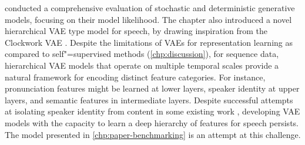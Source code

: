 

\vspace{1em}
\textbf{} conducted a comprehensive evaluation of stochastic and deterministic generative models, focusing on their model likelihood. 
The chapter also introduced a novel hierarchical VAE type model for speech, by drawing inspiration from the Clockwork VAE \parencite{saxena_clockwork_2021}. 
Despite the limitations of VAEs for representation learning as compared to self"=supervised methods (\cref{chp:discussion}), for sequence data, hierarchical VAE models that operate on multiple temporal scales provide a natural framework for encoding distinct feature categories. 
For instance, pronunciation features might be learned at lower layers, speaker identity at upper layers, and semantic features in intermediate layers. Despite successful attempts at isolating speaker identity from content in some existing work \parencite{hsu_unsupervised_2017}, developing VAE models with the capacity to learn a deep hierarchy of features for speech persists. The model presented in \cref{chp:paper-benchmarking} is an attempt at this challenge.

